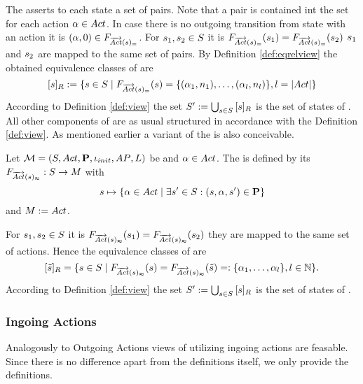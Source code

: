 \documentclass[preview]{standalone}
\begin{document}
The \grpfctN asserts to each state a set of pairs. Note that a pair is contained int the set for each action ${\alpha} \in {Act}$. In case there is no outgoing transition from state \state with an action \action it is $({\alpha}, 0) \in {\ensuremath{{F_{{\overrightarrow{{Act}}}({s})_=}}}}$. For ${s}_1, {s}_2 \in {S}$ it is ${{F_{{\overrightarrow{{Act}}}({s})_=}}}({s}_1) = {{F_{{\overrightarrow{{Act}}}({s})_=}}}({s}_2)$ \iffN ${s}_1$ and ${s}_2$ are mapped to the same set of pairs. By Definition \ref{def:eqrelview} the obtained equivalence classes of \eqrelview are
\[
	{{[{s}]_{{R}}}} := \{{s} \in {S} \mid {\ensuremath{{F_{{\overrightarrow{{Act}}}({s})_=}}}}({s}) = \{({\alpha}_1, {n}_1), \dots, ({\alpha}_l, {n}_l)\}, l = |{Act}|\}
\]
According to Definition \ref{def:view} the set ${S}' := \bigcup_{{s} \in {S}} {{[{s}]_{{R}}}}$ is the set of states of \viewstrongoutactident. All other components of \viewstrongoutactident are as usual structured in accordance with the Definition \ref{def:view}.
As mentioned earlier a \outactidentweak variant of the \outactident \viewN is also conceivable.

\begin{definition}
	Let ${{{\mathcal{M}}}} = {{({S}, {Act}, {\textbf{P}}, {\iota_{init}}, {AP}, {L})}}$ be \chosengraphtypeN and ${\alpha} \in {Act}$. The \viewN \viewweakoutactident is defined by its \grpfctN ${{F_{{\overrightarrow{{Act}}}({s})_\approx}}} : {S} \to {\ensuremath{{M}}}$ with
	\[
	{s} \mapsto \{{\alpha} \in {Act} \mid \exists {s}' \in {S} : ({s}, {\alpha}, {s}') \in {\ensuremath{{\textbf{P}}}}\} 	
	\]
	and ${{M}} := {Act}$.
\end{definition}


For ${s}_1, {s}_2 \in {S}$ it is ${{F_{{\overrightarrow{{Act}}}({s})_\approx}}}({s}_1) = {{F_{{\overrightarrow{{Act}}}({s})_\approx}}}({s}_2)$ \iffN they are mapped to the same set of actions. Hence the equivalence classes of \eqrelview are
\[
	{{[{\tilde{{s}}}]_{{R}}}} = \{ {s} \in {S} \mid {\ensuremath{{F_{{\overrightarrow{{Act}}}({s})_\approx}}}}({s}) = {{F_{{\overrightarrow{{Act}}}({s})_\approx}}}({\tilde{{s}}}) =: \{{\alpha}_1, \dots, {\alpha}_l\}, l \in {\mathbb{N}}\}.
\]
According to Definition \ref{def:view} the set ${S}' := \bigcup_{{s} \in {S}} {{[{s}]_{{R}}}}$ is the set of states of \viewweakoutactident.

\subsubsection{Ingoing Actions}
Analogously to Outgoing Actions views of utilizing ingoing actions are feasable. Since there is no difference apart from the definitions itself, we only provide the definitions.
\end{document}
